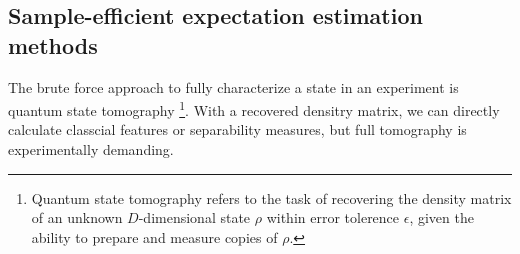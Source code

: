 \documentclass[
aps,
pra,
twocolumn,
floatfix,
]{revtex4-2}
\theoremstyle{plain}
\theoremstyle{definition}
\newtheorem{problem}{Problem}
\newcommand{\dm}{\rho}
\begin{document}
\subsection{Sample-efficient expectation estimation methods}\label{sec:estimation}
The brute force approach to fully characterize a state in an experiment is quantum state tomography \cite{altepeterPhotonicStateTomography2005}
\footnote{Quantum state tomography refers to the task of recovering the density matrix of an unknown $D$-dimensional state $\dm$ within error tolerence $\epsilon$, 
given the ability to prepare and measure copies of $\dm$.}.
With a recovered densitry matrix, we can directly calculate classcial features or separability measures,
but full tomography is experimentally demanding.
\end{document}
